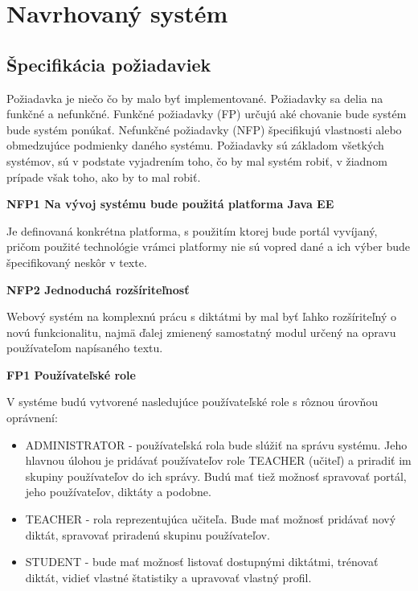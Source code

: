 \documentclass[12pt,oneside]{fithesis2}
\begin{document}
       \section{Navrhovaný systém}
       		\subsection{Špecifikácia požiadaviek} \label{spec-app}
\par Požiadavka je niečo čo by malo byť implementované. Požiadavky sa delia na funkčné a nefunkčné. Funkčné požiadavky (FP) určujú aké chovanie bude systém bude systém ponúkať. Nefunkčné požiadavky (NFP) špecifikujú vlastnosti alebo obmedzujúce podmienky daného systému. Požiadavky sú základom všetkých systémov, sú v podstate vyjadrením toho, čo by mal systém robiť, v žiadnom prípade však toho, ako by to mal robiť\cite{arlow11}.
       		
\bigskip
     \textbf{NFP1 Na vývoj systému bude použitá platforma Java EE}
     \par Je definovaná konkrétna platforma, s použitím ktorej bude portál vyvíjaný, pričom použité technológie vrámci platformy nie sú vopred dané a ich výber bude špecifikovaný neskôr v texte.
     
\bigskip
     \textbf{NFP2 Jednoduchá rozšíriteľnosť}      		
	\par Webový systém na komplexnú prácu s diktátmi by mal byť ľahko rozšíriteľný o novú funkcionalitu, najmä ďalej zmienený samostatný modul určený na opravu používateľom napísaného textu.
	
\bigskip
     \textbf{FP1 Používateľské role}  
     \par V systéme budú vytvorené nasledujúce používateľské role s rôznou úrovňou oprávnení:
\begin{itemize}
	\item ADMINISTRATOR - používateľská rola bude slúžiť na správu systému. Jeho hlavnou úlohou je pridávať používateľov role TEACHER (učiteľ) a priradiť im skupiny používateľov do ich správy. Budú mať tiež možnosť spravovať portál, jeho používateľov, diktáty a podobne.
	\item TEACHER - rola reprezentujúca učiteľa. Bude mať možnosť pridávať nový diktát, spravovať priradenú skupinu používateľov.
	\item STUDENT - bude mať možnosť listovať dostupnými diktátmi, trénovať diktát, vidieť vlastné štatistiky a upravovať vlastný profil.
\end{itemize}
\end{document}

